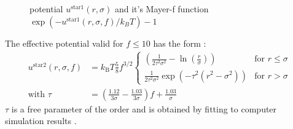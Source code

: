 \begin{figure}[htb]
\captionsetup[subfigure]{position=b}
\centering
{}
\hfill
{}
\caption{potential $u^\text{star1}(r,\sigma)$ and it's Mayer-f function $\exp(-u^\text{star1}(r,\sigma,f)/k_BT)-1$}
\end{figure}

The effective potential valid for $f\leq 10$ has the form
\cite{Jusufi2001,Dzubiella2001,Likos2001}:
\begin{align}
u^\text{star2}(r,\sigma,f) &=
k_\text{B} T \frac{5}{8} f^{3/2}
\begin{cases}
\left(\frac{1}{2\tau^2\sigma^2}-\ln\left(\frac{r}{\sigma}\right) \right)
          & \mbox{for } r \leq \sigma \\
\frac{1}{2\tau^2\sigma^2}
\exp\left(-\tau^2(r^2-\sigma^2)\right)
          & \mbox{for } r >    \sigma
\end{cases} \\
\mbox{with } \tau &= \left(\frac{1.12}{3\sigma}-\frac{1.03}{3\sigma}\right)f+\frac{1.03}{\sigma}
\end{align}
$\tau$ is a free parameter of the order and is obtained by fitting to computer
simulation results \cite{Dzubiella2001}.

